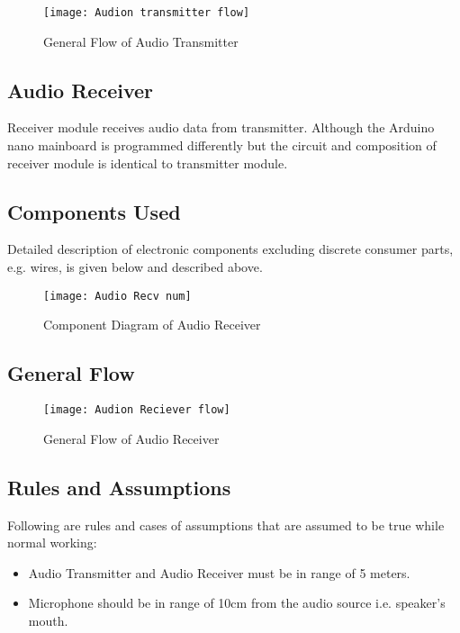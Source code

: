 \begin{figure}[h]
  \centering
  \texttt{[image: Audion transmitter flow]}
  \caption{General Flow of Audio Transmitter}
\end{figure}

\subsection{Audio Receiver}
Receiver module receives audio data from transmitter. Although the Arduino nano mainboard is programmed differently but the circuit and composition of receiver module is identical to transmitter module.

\subsection{Components Used}
Detailed description of electronic components excluding discrete consumer parts, e.g. wires, is given below and described above.

\begin{figure}[h]
  \centering
  \texttt{[image: Audio Recv num]}
  \caption{Component Diagram of Audio Receiver}
\end{figure}

\subsection{General Flow}

\begin{figure}[h]
  \centering
  \texttt{[image: Audion Reciever flow]}
  \caption{General Flow of Audio Receiver}
\end{figure}


\subsection{Rules and Assumptions}
Following are rules and cases of assumptions that are assumed to be true while normal working:

\begin{itemize}

\item Audio Transmitter and Audio Receiver must be in range of 5 meters.
\item Microphone should be in range of 10cm from the audio source i.e. speaker's mouth.

\end{itemize}

